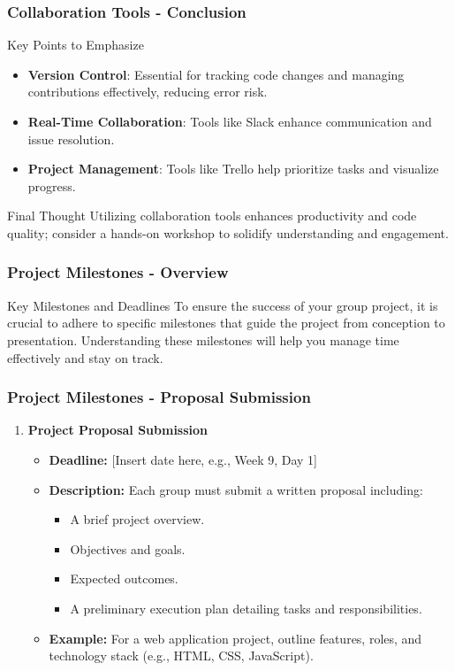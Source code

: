 \documentclass[aspectratio=169]{beamer}
\begin{document}
\begin{frame}[fragile]
    \frametitle{Collaboration Tools - Conclusion}
    \begin{block}{Key Points to Emphasize}
        \begin{itemize}
            \item \textbf{Version Control}: Essential for tracking code changes and managing contributions effectively, reducing error risk.
            \item \textbf{Real-Time Collaboration}: Tools like Slack enhance communication and issue resolution.
            \item \textbf{Project Management}: Tools like Trello help prioritize tasks and visualize progress.
        \end{itemize}
    \end{block}
    \begin{block}{Final Thought}
        Utilizing collaboration tools enhances productivity and code quality; consider a hands-on workshop to solidify understanding and engagement.
    \end{block}
\end{frame}

\begin{frame}[fragile]
    \frametitle{Project Milestones - Overview}
    \begin{block}{Key Milestones and Deadlines}
        To ensure the success of your group project, it is crucial to adhere to specific milestones that guide the project from conception to presentation. 
        Understanding these milestones will help you manage time effectively and stay on track.
    \end{block}
\end{frame}

\begin{frame}[fragile]
    \frametitle{Project Milestones - Proposal Submission}
    \begin{enumerate}
        \item \textbf{Project Proposal Submission}
        \begin{itemize}
            \item \textbf{Deadline:} [Insert date here, e.g., Week 9, Day 1]
            \item \textbf{Description:} Each group must submit a written proposal including:
            \begin{itemize}
                \item A brief project overview.
                \item Objectives and goals.
                \item Expected outcomes.
                \item A preliminary execution plan detailing tasks and responsibilities.
            \end{itemize}
            \item \textbf{Example:} For a web application project, outline features, roles, and technology stack (e.g., HTML, CSS, JavaScript).
        \end{itemize}
    \end{enumerate}
\end{frame}
\end{document}
